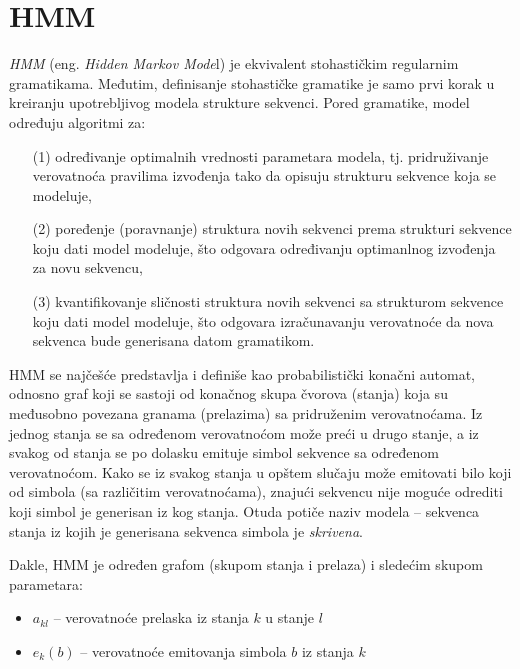 \documentclass[a4paper, 12pt]{article}
\begin{document}
\section{HMM}

\textit{HMM} (eng. \textit{Hidden Markov Mode}l) je ekvivalent stohastičkim regularnim gramatikama. Međutim, definisanje stohastičke gramatike je samo prvi korak u kreiranju upotrebljivog modela strukture sekvenci. Pored gramatike, model određuju algoritmi za:

\begin{enumerate}
\item[(1)] određivanje optimalnih vrednosti parametara modela, tj. pridruživanje verovatnoća pravilima izvođenja tako da opisuju strukturu sekvence koja se modeluje,
\item[(2)] poređenje (poravnanje) struktura novih sekvenci prema strukturi sekvence koju dati model modeluje, što odgovara određivanju optimanlnog izvođenja za novu sekvencu,
\item[(3)] kvantifikovanje sličnosti struktura novih sekvenci sa strukturom sekvence koju dati model modeluje, što odgovara izračunavanju verovatnoće da nova sekvenca bude generisana datom gramatikom.
\end{enumerate}

HMM se najčešće predstavlja i definiše kao probabilistički konačni automat, odnosno graf koji se sastoji od konačnog skupa čvorova (stanja) koja su međusobno povezana granama (prelazima) sa pridruženim verovatnoćama. Iz jednog stanja se sa određenom verovatnoćom može preći u drugo stanje, a iz svakog od stanja se po dolasku emituje simbol sekvence sa određenom verovatnoćom. Kako se iz svakog stanja u opštem slučaju može emitovati bilo koji od simbola (sa različitim verovatnoćama), znajući sekvencu nije moguće odrediti koji simbol je generisan iz kog stanja. Otuda potiče naziv modela -- sekvenca stanja iz kojih je generisana sekvenca simbola je \textit{skrivena}.

\newpage
\noindent Dakle, HMM je određen grafom (skupom stanja i prelaza) i sledećim skupom parametara:

\begin{itemize}[itemsep=-0.03ex]
\renewcommand\labelitemi{\small$\bullet$}
\vspace*{-0.1cm}
\item $a_{kl}$ -- verovatnoće prelaska iz stanja $k$ u stanje $l$ 
\item $e_k(b)$ -- verovatnoće emitovanja simbola $b$ iz stanja $k$
\vspace*{-0.1cm}
\end{itemize}
\end{document}
